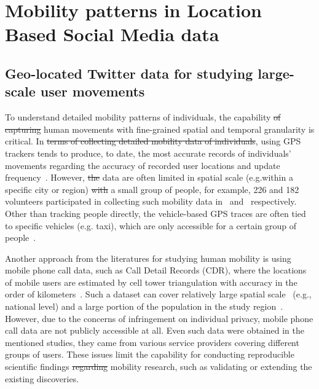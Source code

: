 \documentclass[ijgi,article,submit,moreauthors,pdftex,10pt,a4paper]{mdpi}
\theoremstyle{mdpi}
\newcounter{ex}
\newcounter{re}
\theoremstyle{mdpidefinition}
\providecommand{\DIFadd}[1]{{\protect\color{blue}\uwave{#1}}} %
\providecommand{\DIFdel}[1]{{\protect\color{red}\sout{#1}}}                      %
\providecommand{\DIFaddbegin}{} %
\providecommand{\DIFaddend}{} %
\providecommand{\DIFdelbegin}{} %
\providecommand{\DIFdelend}{} %
\begin{document}
\section{Mobility patterns in Location Based Social Media data}
\subsection{Geo-located Twitter data for studying large-scale user movements}
To understand detailed mobility patterns of individuals, the capability \DIFdelbegin \DIFdel{of capturing }\DIFdelend \DIFaddbegin \DIFadd{to capture }\DIFaddend human movements with fine-grained spatial and temporal granularity is critical.
In \DIFdelbegin \DIFdel{terms of collecting detailed mobility data of individuals}\DIFdelend \DIFaddbegin \DIFadd{this connection}\DIFaddend , using GPS trackers tends to produce, to date, the most accurate records of individuals' movements regarding the accuracy of recorded user locations and update frequency~\cite{zheng2008understanding}.
However, \DIFdelbegin \DIFdel{the }\DIFdelend \DIFaddbegin \DIFadd{such }\DIFaddend data are often limited in spatial scale (e.g.\DIFaddbegin \DIFadd{, }\DIFaddend within a specific city or region) \DIFdelbegin \DIFdel{with }\DIFdelend \DIFaddbegin \DIFadd{from }\DIFaddend a small group of people, for example, 226 and 182 volunteers participated in collecting such mobility data in~\cite{rhee2011levy} and~\cite{zheng2010geolife} respectively.
Other than tracking people directly, the vehicle-based GPS traces are often tied to specific vehicles (e.g. taxi), which are only accessible for a certain group of people~\cite{kung2014exploring}. 

Another approach from the literatures for studying human mobility is using mobile phone call data, such as Call Detail Records (CDR), where the locations of mobile users are estimated by cell tower triangulation with \DIFaddbegin \DIFadd{an }\DIFaddend accuracy in the order of kilometers~\cite{gonzalez2008understanding,sevtsuk2010does,kung2014exploring}.
Such a dataset can cover relatively large spatial scale~\cite{becker2013human,sobolevsky2013delineating} (e.g., national level) and a large portion of the population in the study region~\cite{kung2014exploring}.
However, due to the concerns of infringement on individual privacy, mobile phone call data are not publicly accessible at all.
Even such data were obtained in the mentioned studies, they came from various service providers covering different groups of users.
These issues limit the capability for conducting reproducible scientific findings \DIFdelbegin \DIFdel{regarding }\DIFdelend \DIFaddbegin \DIFadd{for }\DIFaddend mobility research, such as validating or extending the existing discoveries.
\end{document}
